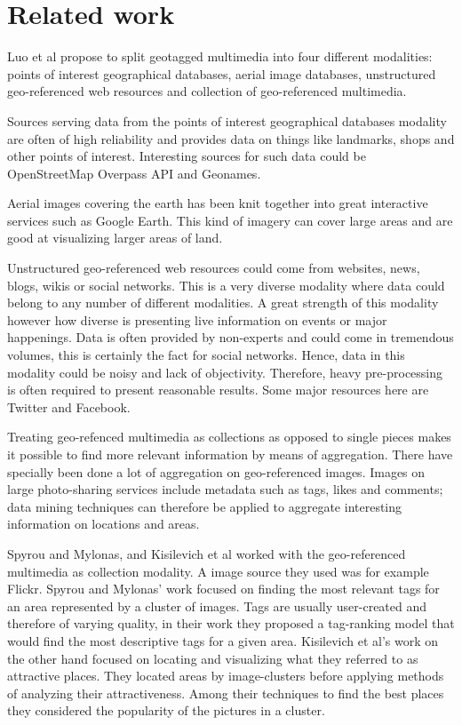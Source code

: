 \documentclass[journal]{IEEEtran}
\begin{document}
\section{Related work}
Luo et al\cite{geotagging-survey} propose to split geotagged multimedia into four different modalities: points of interest geographical databases, aerial image databases, unstructured geo-referenced web resources and collection of geo-referenced multimedia. 

Sources serving data from the points of interest geographical databases modality are often of high reliability and provides data on things like landmarks, shops and other points of interest. Interesting sources for such data could be OpenStreetMap Overpass API\cite{overpass} and Geonames\cite{geonames}. 

Aerial images covering the earth has been knit together into great interactive services such as Google Earth\cite{google-earth}. This kind of imagery can cover large areas and are good at visualizing larger areas of land. 

Unstructured geo-referenced web resources could come from websites, news, blogs, wikis or social networks. This is a very diverse modality where data could belong to any number of different modalities. A great strength of this modality however how diverse is presenting live information on events or major happenings. Data is often provided by non-experts and could come in tremendous volumes, this is certainly the fact for social networks. Hence, data in this modality could be noisy and lack of objectivity. Therefore, heavy pre-processing is often required to present reasonable results. Some major resources here are Twitter\cite{twitter} and Facebook\cite{facebook}. 

Treating geo-refenced multimedia as collections as opposed to single pieces makes it possible to find more relevant information by means of aggregation. There have specially been done a lot of aggregation on geo-referenced images. Images on large photo-sharing services include metadata such as tags, likes and comments; data mining techniques can therefore be applied to aggregate interesting information on locations and areas.

Spyrou and Mylonas\cite{placing-meta-on-map}, and Kisilevich et al\cite{next-vacation} worked with the geo-referenced multimedia as collection modality. A image source they used was for example Flickr\cite{flickr}. Spyrou and Mylonas' work focused on finding the most relevant tags for an area represented by a cluster of images. Tags are usually user-created and therefore of varying quality, in their work they proposed a tag-ranking model that would find the most descriptive tags for a given area. Kisilevich et al's work on the other hand focused on locating and visualizing what they referred to as attractive places. They located areas by image-clusters before applying methods of analyzing their attractiveness. Among their techniques to find the best places they considered the popularity of the pictures in a cluster.
\end{document}
